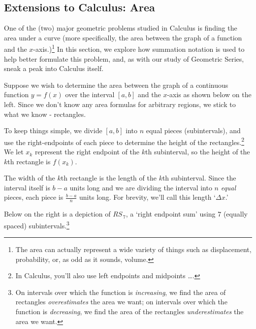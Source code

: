 \subsection{Extensions to Calculus: Area}

One of the (two) major geometric problems studied in Calculus is finding the area under a curve (more specifically, the area between the graph of a function and the $x$-axis.)\footnote{The area can actually represent a wide variety of things such as displacement, probability, or, as odd as it sounds, volume.}  In this section, we explore how summation notation is used to help better formulate this problem, and, as with our study of Geometric Series, sneak a peak into Calculus itself.

Suppose we wish to determine the area between the graph of a continuous function $y = f(x)$  over the interval  $[a,b]$ and the $x$-axis as shown below on the left.  Since we don't know any area formulas for arbitrary regions, we stick to what we know - rectangles.  

To keep things simple, we  divide $[a,b]$ into $n$ equal pieces (subintervals), and use the right-endpoints of each piece to determine the height of the rectangles.\footnote{In Calculus, you'll also use left endpoints and midpoints \ldots.}  We let $x_{k}$ represent the right endpoint of the $k$th subinterval, so the height of the $k$th rectangle is $f(x_{k})$.  

The width of the $k$th rectangle is the length of the $k$th subinterval.  Since the interval itself is $b-a$ units long and we are dividing the interval into $n$ \textit{equal} pieces, each piece is $\frac{b-a}{n}$  units long.  For brevity, we'll call this length  `$\Delta x$.'  

Below on the right is a depiction of $RS_{\, 7}$, a `right endpoint sum' using $7$ (equally spaced) subintervals.\footnote{On intervals over which the function is \textit{increasing}, we find the area of rectangles \textit{overestimates} the area we want;  on intervals over which the function is \textit{decreasing}, we find the area of the rectangles \textit{underestimates} the area we want.}

